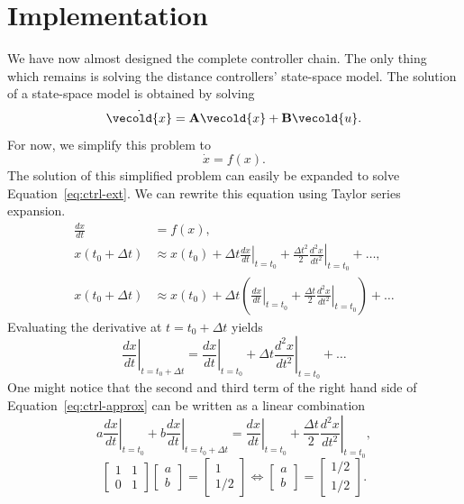 \documentclass[11pt,titlepage]{report}
\let\vec\vecold
\newcommand{\vec}[1]{\mathbf{#1}}
\begin{document}
\section{Implementation}
We have now almost designed the complete controller chain. The only thing which remains is solving the distance controllers' state-space model. The solution of a state-space model is obtained by solving
\begin{equation} \label{eq:ctrl-ext}
	\dot{\vec{x}}=\mat{A}\vec{x}+\mat{B}\vec{u}.
\end{equation}
For now, we simplify this problem to
\begin{equation*}
	\dot{x}=f(x).
\end{equation*}
The solution of this simplified problem can easily be expanded to solve Equation~\ref{eq:ctrl-ext}. We can rewrite this equation using Taylor series expansion.
\begin{align}
\frac{dx}{dt} &= f(x), \nonumber \\
x(t_0+\Delta t) &\approx
x(t_0)+
\left. \Delta t \frac{dx}{dt} \right|_{t=t_0}+
\frac{\Delta t^2}{2}\left. \frac{d^2x}{dt^2} \right|_{t=t_0}+
\dots, \nonumber \\
x(t_0+\Delta t) &\approx
x(t_0)+
\Delta t \left(
\left. \frac{dx}{dt} \right|_{t=t_0}+
\frac{\Delta t}{2}\left. \frac{d^2x}{dt^2} \right|_{t=t_0}
\right) + \dots \label{eq:ctrl-approx}
\end{align}
Evaluating the derivative at $t=t_0+\Delta t$ yields
\begin{equation*}
\left. \frac{dx}{dt} \right|_{t=t_0+\Delta t} =
\left. \frac{dx}{dt} \right|_{t=t_0} +
\Delta t \left. \frac{d^2x}{dt^2} \right|_{t=t_0} + \dots
\end{equation*}
One might notice that the second and third term of the right hand side of Equation~\ref{eq:ctrl-approx} can be written as a linear combination
\begin{equation*}
a \left. \frac{dx}{dt} \right|_{t=t_0} +
b \left. \frac{dx}{dt} \right|_{t=t_0+\Delta t} =
\left. \frac{dx}{dt} \right|_{t=t_0}+
\frac{\Delta t}{2}\left. \frac{d^2x}{dt^2} \right|_{t=t_0},
\end{equation*}
\begin{equation*}
\begin{bmatrix}
1 & 1 \\
0 & 1
\end{bmatrix} \begin{bmatrix}
a \\
b
\end{bmatrix} = \begin{bmatrix}
1 \\
1/2
\end{bmatrix} \Leftrightarrow \begin{bmatrix}
a \\
b
\end{bmatrix} = \begin{bmatrix}
1/2 \\
1/2
\end{bmatrix}.
\end{equation*}
\end{document}
